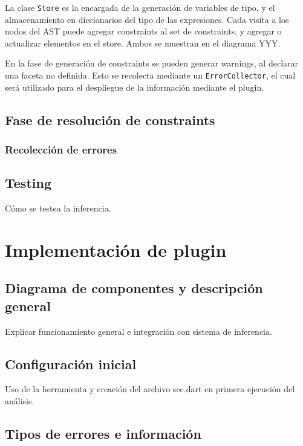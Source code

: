 La clase \texttt{Store} es la encargada de la generación de variables de tipo, y el almacenamiento en diccionarios del tipo de las expresiones. Cada visita a los nodos del AST puede agregar constraints al set de constraints, y agregar o actualizar elementos en el store. Ambos se muestran en el diagrama YYY.

En la fase de generación de constraints se pueden generar warnings, al declarar una faceta no definida. Esto se recolecta mediante un \texttt{ErrorCollector}, el cual será utilizado para el despliegue de la información mediante el plugin.

\subsection{Fase de resolución de constraints}

\subsubsection{Recolección de errores}

\subsection{Testing}
Cómo se testea la inferencia.

\section{Implementación de plugin}

\subsection{Diagrama de componentes y descripción general}
Explicar funcionamiento general e integración con sistema de inferencia.

\subsection{Configuración inicial}
Uso de la herramienta y creación del archivo sec.dart en primera ejecución del análisis.

\subsection{Tipos de errores e información}

